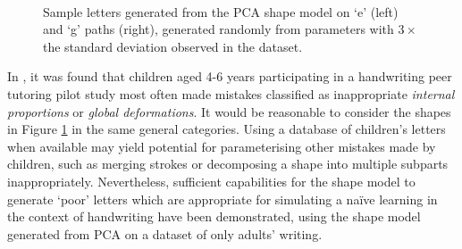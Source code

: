\documentclass{sig-alternate}
\begin{document}
\begin{figure}[thpb]
\centering
{}
~~~~~
\caption[Sample letters generated from the PCA shape model on `e' and `g'
paths.]{\label{fig:sampleLetters}Sample letters generated from the PCA shape
model on `e' (left) and `g' paths (right), generated randomly from
parameters with $3\times$ the standard deviation observed in the dataset.}

\end{figure}

In \cite{Chandra2013}, it was found that children aged 4-6 years participating
in a handwriting peer tutoring pilot study most often made mistakes classified
as inappropriate \emph{internal proportions} or \emph{global deformations}. It
would be reasonable to consider the shapes in Figure \ref{fig:sampleLetters} in
the same general categories. Using a database of children's letters when
available may yield potential for parameterising other mistakes made by
children, such as merging strokes or decomposing a shape into multiple subparts
inappropriately. Nevertheless, sufficient capabilities for the shape model to
generate `poor' letters which are appropriate for simulating a na\"ive learning
in the context of handwriting have been demonstrated, using the shape model
generated from PCA on a dataset of only adults' writing.
\end{document}

